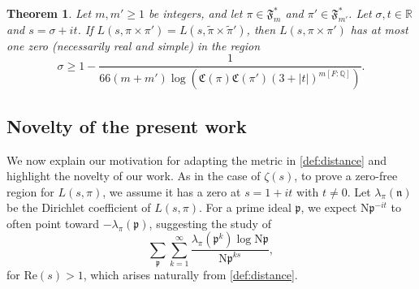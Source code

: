 \documentclass[12pt,reqno]{amsart}
\renewcommand{\tilde}{\widetilde}
\newtheorem{thm}{Theorem}[section]
\theoremstyle{remark}
\renewcommand{\tilde}{\widetilde}
\renewcommand{\tilde}{\widetilde}
\renewcommand{\Re}{\mathrm{Re}}
\newcommand{\N}{\mathrm{N}}
\newcommand{\Q}{\mathbb{Q}}
\newcommand{\kp}{\mathfrak{p}}
\numberwithin{equation}{section}
\begin{document}
	
	\begin{thm}\label{thm2:ZFR-rankin-selberg} %
	Let $m, m' \ge 1$ be integers, and  let $\pi \in \mathfrak{F}^*_m$ and $\pi' \in \mathfrak{F}^*_{m'}$.
		Let $\sigma,t\in\mathbb{R}$ and $s= \sigma+it$. %
		If $L(s, \pi \times \pi') = L(s, \tilde{\pi} \times \tilde{\pi}')$, then
    $L(s, \pi \times \pi')$ has at most one zero (necessarily real and simple) in the region
		\[
		\sigma 
		\ge 1- \frac{1}{66(m+m')\log(\mathfrak{C}(\pi) \mathfrak{C}(\pi')(3+|t|)^{m[F:\Q]})}.%
		\]
	\end{thm}

    \subsection{Novelty of the present work}

    We now explain our motivation for adapting the metric in \eqref{def:distance} and highlight the novelty of our work. As in the case of $\zeta(s)$, to prove a zero-free region for $L(s, \pi)$, we assume it has a zero at $s = 1 + it$ with $t \neq 0$. Let $\lambda_{\pi}(\mathfrak{n})$ be the Dirichlet coefficient of $L(s, \pi)$. For a prime ideal $\kp$, we expect $\N\kp^{-it}$ to often point toward $-\lambda_{\pi}(\kp)$, suggesting the study of \begin{equation} \label{eq:lambda} \sum_{\mathfrak{p}} \sum_{k=1}^{\infty} \frac{\lambda_{\pi}(\kp^{k}) \log \N\kp}{\N\kp^{ks}}, \end{equation} for $\Re(s) > 1$, which arises naturally from \eqref{def:distance}.
\end{document}
